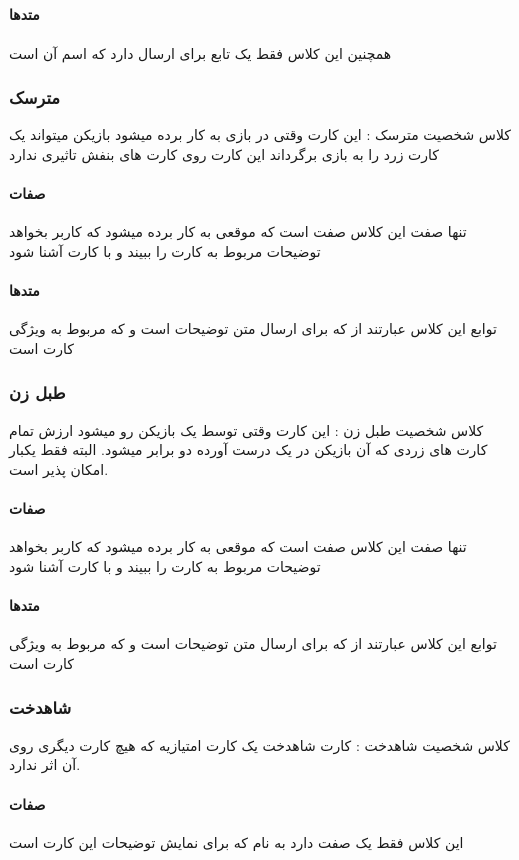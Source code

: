 \documentclass[pdf,titlepage,a4paper]{report}
\begin{document}
	\subparagraph{}
	
	\paragraph{متدها}
	همچنین این کلاس فقط یک تابع برای ارسال  دارد که اسم آن  است
	\subsubsection{مترسک}
	کلاس شخصیت مترسک : این کارت وقتی در بازی به کار برده میشود بازیکن میتواند یک کارت زرد را به بازی برگرداند 
	این کارت روی کارت های بنفش تاثیری ندارد
	\paragraph{صفات}
	 تنها  صفت این کلاس صفت   است که موقعی به کار برده میشود که کاربر بخواهد توضیحات مربوط به کارت را ببیند و با کارت آشنا شود
	 
	 \paragraph{متدها}
	 توابع این کلاس عبارتند از  
	  که برای ارسال متن توضیحات است 
	 و  که مربوط به ویژگی کارت است
	\subsubsection{طبل زن}
	 کلاس شخصیت طبل زن : این کارت وقتی توسط یک بازیکن رو میشود ارزش تمام کارت های زردی که آن بازیکن در یک درست آورده دو برابر میشود. البته فقط یکبار امکان پذیر است.

    \paragraph{صفات}
	تنها  صفت این کلاس صفت   است که موقعی به کار برده میشود که کاربر بخواهد توضیحات مربوط به کارت را ببیند و با کارت آشنا شود
	\paragraph{متدها}
	توابع این کلاس عبارتند از  
	 که برای ارسال متن توضیحات است 
	و  که مربوط به ویژگی کارت است
	\subsubsection{شاهدخت}
	 کلاس شخصیت شاهدخت : کارت شاهدخت یک کارت امتیازیه که هیچ کارت دیگری روی آن اثر ندارد.
	\paragraph{صفات}
	این کلاس فقط یک صفت دارد به نام   که برای نمایش توضیحات این کارت است
\end{document}
